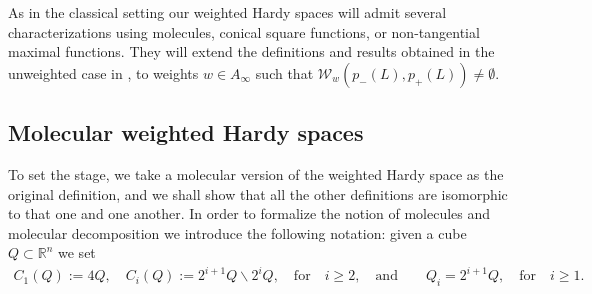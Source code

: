 \documentclass[11pt, a4paper,leqno]{amsart}
\theoremstyle{plain}
\theoremstyle{definition}
\theoremstyle{remark}
\numberwithin{equation}{section}
\def \R{ \mathbb{R} }
\begin{document}
As in the classical setting our weighted Hardy spaces will admit several characterizations using molecules, conical square functions, or non-tangential maximal functions. They will extend the definitions and results obtained in the unweighted case  in \cite{HofmannMayboroda}, to weights $w\in A_{\infty}$ such that $\mathcal{W}_w(p_-(L),p_+(L))\neq \emptyset$.


\subsection{Molecular weighted Hardy spaces}

To set the stage, we take a molecular version of the weighted Hardy space as the original definition, and we shall show that all the other definitions are isomorphic to that one and one another. In order to formalize the notion of molecules and molecular decomposition we introduce the following notation: given a cube $Q\subset \R^n$ we set
\begin{align}\label{100}
C_1(Q):=4Q, \quad  C_i(Q):=2^{i+1}Q\backslash 2^{i}Q,\quad\textrm{for}\quad i\geq 2, \quad
 \textrm{and}\quad \quad Q_i=2^{i+1}Q, \quad\textrm{for}\quad i\geq 1. 
\end{align}
\end{document}
